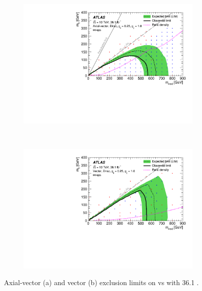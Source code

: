 \begin{figure}[htb]
    \centering
    \begin{subfigure}[b]{0.48\textwidth}
        \includegraphics[width=\textwidth]{Figures/limits_dmA.pdf}
        \label{fig:limits_dmA}
    \end{subfigure}
    ~ %
    \begin{subfigure}[b]{0.48\textwidth}
        \includegraphics[width=\textwidth]{Figures/limits_dmV.pdf}
        \label{fig:limits_dmV}
    \end{subfigure}
    \caption{Axial-vector (a) and vector (b) exclusion limits on \mchi vs \mmed with 36.1 \ifb.}
\label{fig:limits}
\end{figure}

